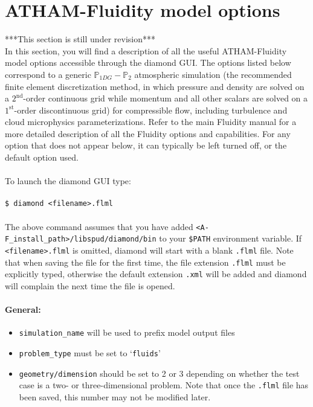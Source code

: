 \documentclass[10pt,a4paper]{article}
\newcommand\tab[1][0.5cm]{\hspace*{#1}}
\begin{document}
\section{ATHAM-Fluidity model options} \label{Config}
***This section is still under revision***\\
In this section, you will find a description of all the useful ATHAM-Fluidity model options accessible through the diamond GUI. The options listed below correspond to a generic $\mathbb{P}_{1DG}-\mathbb{P}_2$ atmospheric simulation (the recommended finite element discretization method, in which pressure and density are solved on a $2^{\mathrm{nd}}$-order continuous grid while momentum and all other scalars are solved on a $1^{\mathrm{st}}$-order discontinuous grid) for compressible flow, including turbulence and cloud microphysics parameterizations. Refer to the main Fluidity manual for a more detailed description of all the Fluidity options and capabilities. For any option that does not appear below, it can typically be left turned off, or the default option used.\\\\
To launch the diamond GUI type:\\\\
\tab \texttt{\$ diamond <filename>.flml}\\\\
The above command assumes that you have added \texttt{<A-F\_install\_path>/libspud/diamond/bin} to your \texttt{\$PATH} environment variable. If \texttt{<filename>.flml} is omitted, diamond will start with a blank \texttt{.flml} file. Note that when saving the file for the first time, the file extension \texttt{.flml} must be explicitly typed, otherwise the default extension \texttt{.xml} will be added and diamond will complain the next time the file is opened.

\paragraph{General:}
\begin{itemize}
\item \texttt{simulation\_name} will be used to prefix model output files
\item \texttt{problem\_type} must be set to `\texttt{fluids}'
\item \texttt{geometry/dimension} should be set to 2 or 3 depending on whether the test case is a two- or three-dimensional problem. Note that once the \texttt{.flml} file has been saved, this number may not be modified later.
\end{itemize}
\end{document}
